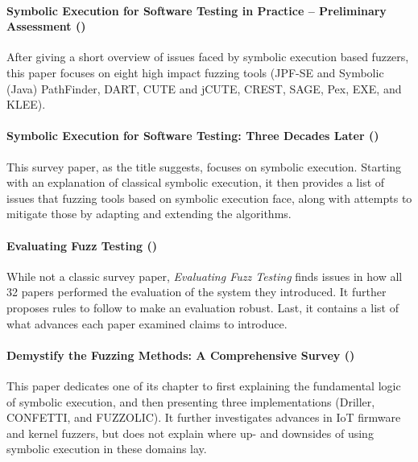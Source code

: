 \documentclass{article}
\begin{document}
\paragraph{Symbolic Execution for Software Testing in Practice – Preliminary Assessment (\citeyear{PreliminaryAssessment})}
After giving a short overview of issues faced by symbolic execution based fuzzers, this paper focuses on eight high impact fuzzing tools (JPF-SE and Symbolic (Java) PathFinder\cite{JPFSE, JavaPathFinder}, DART\cite{DART}, CUTE\cite{CUTE} and jCUTE, CREST\cite{CREST}, SAGE\cite{SAGE}, Pex\cite{Pex}, EXE\cite{EXE}, and KLEE\cite{KLEE}).

\paragraph{Symbolic Execution for Software Testing: Three Decades Later (\citeyear{ReviewThreeDecades})}
This survey paper, as the title suggests, focuses on symbolic execution. Starting with an explanation of classical symbolic execution, it then provides a list of issues that fuzzing tools based on symbolic execution face, along with attempts to mitigate those by adapting and extending the algorithms.\cite{ReviewThreeDecades}

\paragraph{Evaluating Fuzz Testing (\citeyear{ReviewThreeDecades})}
While not a classic survey paper, \textit{Evaluating Fuzz Testing} finds issues in how all 32 papers performed the evaluation of the system they introduced. It further proposes rules to follow to make an evaluation robust. Last, it contains a list of what advances each paper examined claims to introduce.\cite{EvaluatingFuzzTesting}

\paragraph{Demystify the Fuzzing Methods: A Comprehensive Survey (\citeyear{Demystifying})}
This paper dedicates one of its chapter to first explaining the fundamental logic of symbolic execution, and then presenting three implementations (Driller\cite{Driller}, CONFETTI\cite{CONFETTI}, and FUZZOLIC\cite{FUZZOLIC}). It further investigates advances in IoT firmware and kernel fuzzers, but does not explain where up- and downsides of using symbolic execution in these domains lay.\cite{Demystifying}
\end{document}

